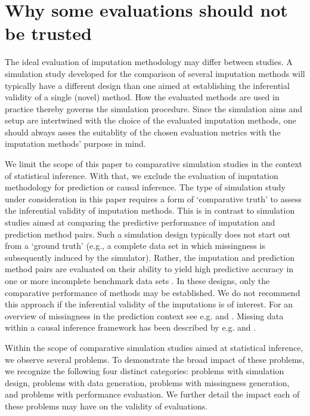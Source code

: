 \documentclass[bimj,fleqn]{w-art}
\begin{document}
\section{Why some evaluations should not be trusted}


The ideal evaluation of imputation methodology may differ between studies. A simulation study developed for the comparison of several imputation methods will typically have a different design than one aimed at establishing the inferential validity of a single (novel) method. How the evaluated methods are used in practice thereby governs the simulation procedure. Since the simulation aims and setup are intertwined with the choice of the evaluated imputation methods, one should always asses the suitablity of the chosen evaluation metrics with the imputation methods' purpose in mind. 

We limit the scope of this paper to comparative simulation studies in the context of statistical inference. With that, we exclude the evaluation of imputation methodology for prediction or causal inference. The type of simulation study under consideration in this paper requires a form of `comparative truth' to assess the inferential validity of imputation methods. This is in contrast to simulation studies aimed at comparing the predictive performance of imputation and prediction method pairs. Such a simulation design typically does not start out from a `ground truth' (e.g., a complete data set in which missingness is subsequently induced by the simulator). Rather, the imputation and prediction method pairs are evaluated on their ability to yield high predictive accuracy in one or more incomplete benchmark data sets \citep{liu21}. In these designs, only the comparative performance of methods may be established. We do not recommend this approach if the inferential validity of the imputations is of interest. For an overview of missingness in the prediction context see e.g. \citet{wood15} and \citet{sper20}. Missing data within a causal inference framework has been described by e.g. \cite{more18} and \cite{moha21}.

Within the scope of comparative simulation studies aimed at statistical inference, we observe several problems. To demonstrate the broad impact of these problems, we recognize the following four distinct categories: problems with simulation design, problems with data generation, problems with missingness generation, and problems with performance evaluation. We further detail the impact each of these problems may have on the validity of evaluations. 
\end{document}
